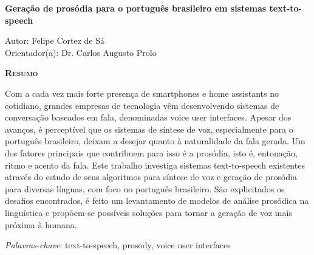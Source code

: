 \begin{center}
	{\Large{\textbf{Geração de prosódia para o português brasileiro em sistemas text-to-speech}}}
\end{center}

\vspace{1cm}

\begin{flushright}
	Autor: Felipe Cortez de Sá \\
	Orientador(a): Dr. Carlos Augusto Prolo
\end{flushright}

\vspace{1cm}

\begin{center}
	\Large{\textsc{\textbf{Resumo}}}
\end{center}

\noindent Com a cada vez mais forte presença de smartphones e home assistants no
cotidiano, grandes empresas de tecnologia vêm desenvolvendo sistemas de
conversação baseados em fala, denominadas voice user interfaces. Apesar dos avanços, é perceptível que os sistemas de síntese de voz, especialmente para o português brasileiro, deixam a desejar quanto à naturalidade da fala gerada. Um dos fatores principais que contribuem para isso é a prosódia, isto é, entonação, ritmo e acento da fala. Este trabalho investiga sistemas text-to-speech existentes através do estudo de seus algoritmos para síntese de voz e geração de prosódia para diversas línguas, com foco no português brasileiro. São explicitados os desafios encontrados, é feito um levantamento de modelos de análise prosódica na linguística e propõem-se possíveis soluções para tornar a geração de voz mais próxima à humana.

\noindent\textit{Palavras-chave}: text-to-speech, prosody, voice user interfaces
